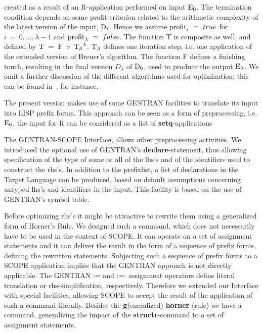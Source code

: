 created as a result of an R-application performed on input ${{\rm
E}}_{0}$.  The termination condition depends on some profit criterion
related to the arithmetic complexity of the latest version of the
input, ${{{\rm D}}_i}$. Hence we assume ${{{\rm profit}}_i}\ =\ true$
for $i\ =\ 0,..., \lambda -1$ and ${{{\rm profit}}_\lambda}\ =\
false$.  The function T is composite as well, and defined by ${{\rm
T}}\ =\ {{\rm F}}\ \circ\ {{{{\rm T}}_{\beta}}^{\lambda}}$. ${{\rm
T}}_{\beta}$ defines one iteration step, i.e. one application of the
extended version of Breuer's algorithm. The function F defines a
finishing touch, resulting in the final version $D_{\lambda}$ of
${{\rm D}}_{0}$, used to produce the output ${{\rm E}}_{\lambda}$. We
omit a further discussion of the different algorithms used for
optimization; this can be found in~\cite{vanHulzen:81,vanHulzen:83},
for instance.

The present version makes use of some GENTRAN facilities to translate
its input into LISP prefix forms. This approach can be seen as a form
of preprocessing, i.e. ${{\rm E}}_{0}$, the input for R can be
considered as a list of {\bf setq}-applications

The GENTRAN-SCOPE Interface, allows other preprocessing activities.
We introduced the optional use of GENTRAN's {\bf declare}-statement,
\index{DECLARE statement ! GENTRAN}
thus allowing specification of the type of some or all of the lhs's and of
the identifiers used to construct the rhs's. In addition to the
prefixlist, a list of declarations in the Target Language can be
produced, based on default assumptions concerning untyped lhs's and
identifiers in the input.  This facility is based on the use of
GENTRAN's symbol table.

Before optimizing rhs's it might be attractive to rewrite them using a
\index{Horner's Rule}
generalized form of Horner's Rule. We designed such a command, which
does not necessarily have to be used in the context of SCOPE. It can
operate on a set of assignment statements and it can deliver the
result in the form of a sequence of prefix forms, defining the
rewritten statements. Subjecting such a sequence of prefix forms to a
SCOPE application implies that the GENTRAN approach is not directly
applicable. The GENTRAN := and :=: assignment operators define literal
translation or rhs-simplification, respectively. Therefore we extended
our Interface with special facilities, allowing SCOPE to accept the
result of the application of such a command literally. Besides the
{\bf g}(eneralized) {\bf horner} (rule) we have a command,
generalizing the impact of the {\bf structr}-command to a set of
assignment statements.

